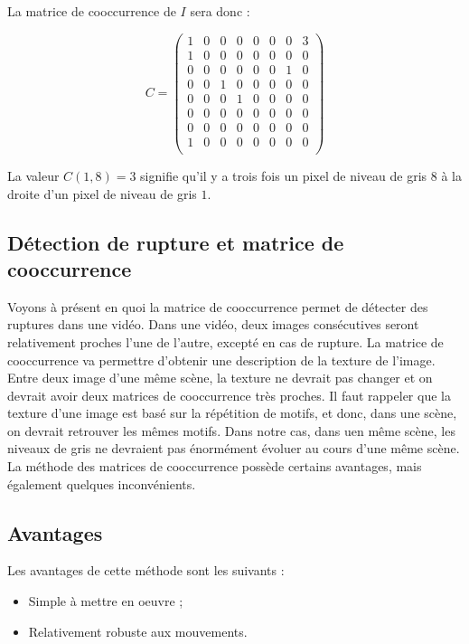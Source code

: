 La matrice de cooccurrence de $I$ sera donc :

\[
 C = \begin{pmatrix}
     1 & 0 & 0 & 0 & 0 & 0 & 0 & 3 \\
     1 & 0 & 0 & 0 & 0 & 0 & 0 & 0 \\
     0 & 0 & 0 & 0 & 0 & 0 & 1 & 0 \\
     0 & 0 & 1 & 0 & 0 & 0 & 0 & 0 \\
     0 & 0 & 0 & 1 & 0 & 0 & 0 & 0 \\
     0 & 0 & 0 & 0 & 0 & 0 & 0 & 0 \\
     0 & 0 & 0 & 0 & 0 & 0 & 0 & 0 \\
     1 & 0 & 0 & 0 & 0 & 0 & 0 & 0 \\   
 \end{pmatrix}
\]

La valeur $C(1, 8) = 3$ signifie qu'il y a trois fois un pixel de niveau de gris $8$ à la droite d'un pixel de niveau de gris $1$.

\subsection{Détection de rupture et matrice de cooccurrence}

Voyons à présent en quoi la matrice de cooccurrence permet de détecter des ruptures dans une vidéo. Dans une vidéo, deux images consécutives seront relativement proches l'une de l'autre, excepté en cas de rupture. La matrice de cooccurrence va permettre d'obtenir une description de la texture de l'image. Entre deux image d'une même scène, la texture ne devrait pas changer et on devrait avoir deux matrices de cooccurrence très proches. Il faut rappeler que la texture d'une image est basé sur la répétition de motifs, et donc, dans une scène, on devrait retrouver les mêmes motifs. Dans notre cas, dans uen même scène, les niveaux de gris ne devraient pas énormément évoluer au cours d'une même scène.\\

La méthode des matrices de cooccurrence possède certains avantages, mais également quelques inconvénients.

\subsection{Avantages}

Les avantages de cette méthode sont les suivants :

\begin{itemize}
	\item Simple à mettre en oeuvre ;
	\item Relativement robuste aux mouvements.
\end{itemize}

